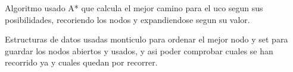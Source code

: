 Algoritmo usado A* que calcula el mejor camino para el uco segun sus posibilidades, recoriendo los nodos y expandiendose segun su valor.

Estructuras de datos usadas monticulo para ordenar el mejor nodo y set para guardar los nodos abiertos y usados, y asi poder comprobar cuales se han recorrido ya y cuales quedan por recorrer. 

